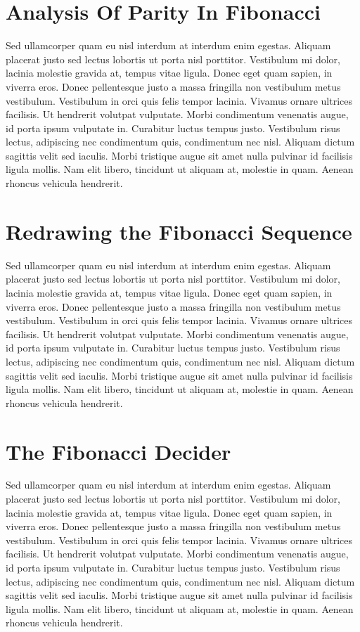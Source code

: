 \section{Analysis Of Parity In Fibonacci}

Sed ullamcorper quam eu nisl interdum at interdum enim egestas. Aliquam placerat justo sed lectus lobortis ut porta nisl porttitor. Vestibulum mi dolor, lacinia molestie gravida at, tempus vitae ligula. Donec eget quam sapien, in viverra eros. Donec pellentesque justo a massa fringilla non vestibulum metus vestibulum. Vestibulum in orci quis felis tempor lacinia. Vivamus ornare ultrices facilisis. Ut hendrerit volutpat vulputate. Morbi condimentum venenatis augue, id porta ipsum vulputate in. Curabitur luctus tempus justo. Vestibulum risus lectus, adipiscing nec condimentum quis, condimentum nec nisl. Aliquam dictum sagittis velit sed iaculis. Morbi tristique augue sit amet nulla pulvinar id facilisis ligula mollis. Nam elit libero, tincidunt ut aliquam at, molestie in quam. Aenean rhoncus vehicula hendrerit.

\section{Redrawing the Fibonacci Sequence}

Sed ullamcorper quam eu nisl interdum at interdum enim egestas. Aliquam placerat justo sed lectus lobortis ut porta nisl porttitor. Vestibulum mi dolor, lacinia molestie gravida at, tempus vitae ligula. Donec eget quam sapien, in viverra eros. Donec pellentesque justo a massa fringilla non vestibulum metus vestibulum. Vestibulum in orci quis felis tempor lacinia. Vivamus ornare ultrices facilisis. Ut hendrerit volutpat vulputate. Morbi condimentum venenatis augue, id porta ipsum vulputate in. Curabitur luctus tempus justo. Vestibulum risus lectus, adipiscing nec condimentum quis, condimentum nec nisl. Aliquam dictum sagittis velit sed iaculis. Morbi tristique augue sit amet nulla pulvinar id facilisis ligula mollis. Nam elit libero, tincidunt ut aliquam at, molestie in quam. Aenean rhoncus vehicula hendrerit.

\section{The Fibonacci Decider}

Sed ullamcorper quam eu nisl interdum at interdum enim egestas. Aliquam placerat justo sed lectus lobortis ut porta nisl porttitor. Vestibulum mi dolor, lacinia molestie gravida at, tempus vitae ligula. Donec eget quam sapien, in viverra eros. Donec pellentesque justo a massa fringilla non vestibulum metus vestibulum. Vestibulum in orci quis felis tempor lacinia. Vivamus ornare ultrices facilisis. Ut hendrerit volutpat vulputate. Morbi condimentum venenatis augue, id porta ipsum vulputate in. Curabitur luctus tempus justo. Vestibulum risus lectus, adipiscing nec condimentum quis, condimentum nec nisl. Aliquam dictum sagittis velit sed iaculis. Morbi tristique augue sit amet nulla pulvinar id facilisis ligula mollis. Nam elit libero, tincidunt ut aliquam at, molestie in quam. Aenean rhoncus vehicula hendrerit.

